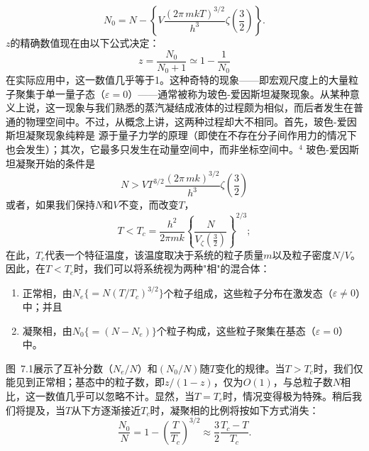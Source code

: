 \begin{equation}\tag{7.1.22}\label{eq:7.1.22}
N _ { 0 } = N - \left\{ V \frac { ( 2 \pi \, m k T ) ^{3 / 2} } { h ^{3} } \zeta \left( \frac { 3 } { 2 } \right) \right\} .
\end{equation}
\(z\)的精确数值现在由以下公式决定：
\begin{equation}\tag{7.1.23}\label{eq:7.1.23}
z = \frac { N _ { 0 } } { N _ { 0 } + 1 } \simeq 1 - \frac { 1 } { N _ { 0 } }
\end{equation}
在实际应用中，这一数值几乎等于1。这种奇特的现象——即宏观尺度上的大量粒子聚集于单一量子态（\(\varepsilon=0\)）——通常被称为玻色-爱因斯坦凝聚现象。从某种意义上说，这一现象与我们熟悉的蒸汽凝结成液体的过程颇为相似，而后者发生在普通的物理空间中。不过，从概念上讲，这两种过程却大不相同。首先，玻色-爱因斯坦凝聚现象纯粹是
源于量子力学的原理（即使在不存在分子间作用力的情况下也会发生）；其次，它最多只发生在动量空间中，而非坐标空间中。\(^{4}\)
玻色-爱因斯坦凝聚开始的条件是
\begin{equation}\tag{7.1.24}\label{eq:7.1.24}
N > V T ^{3 / 2} \frac { ( 2 \pi \, m k ) ^{3 / 2} } { h ^{3} } \zeta \left( \frac { 3 } { 2 } \right)
\end{equation}
或者，如果我们保持\(N\)和\(V\)不变，而改变\(T\)，
\begin{equation}\tag{7.1.25}\label{eq:7.1.25}
T < T _ { c } = \frac { h ^{2} } { 2 \pi m k } \left\{ \frac { N } { V _ { \zeta } \left( \frac { 3 } { 2 } \right) } \right\} ^{2 / 3} ;
\end{equation}
在此，\(T_{c}\)代表一个特征温度，该温度取决于系统的粒子质量\(m\)以及粒子密度\(N/V\)。因此，在\(T < T_{c}\)时，我们可以将系统视为两种"相"的混合体：
\begin{enumerate}
\def\labelenumi{(\roman{enumi})}
\item
  正常相，由\(N_{e} \{= N(T/T_{c})^{3/2}\}\)个粒子组成，这些粒子分布在激发态（\(\varepsilon \neq 0\)）中；并且
\item
  凝聚相，由\(N_{0} \{=(N-N_{e})\}\)个粒子构成，这些粒子聚集在基态（\(\varepsilon = 0\)）中。
\end{enumerate}
图~7.1展示了互补分数（\(N_{e}/N\)）和\((N_{0}/N)\)随\(T\)变化的规律。当\(T > T_{c}\)时，我们仅能见到正常相；基态中的粒子数，即\(z/(1-z)\)，仅为\(O(1)\)，与总粒子数\(N\)相比，这一数值几乎可以忽略不计。显然，当\(T = T_{c}\)时，情况变得极为特殊。稍后我们将提及，当\(T\)从下方逐渐接近\(T_{c}\)时，凝聚相的比例将按如下方式消失：
\begin{equation}\tag{7.1.26}\label{eq:7.1.26}
\frac { N _ { 0 } } { N } = 1 - \left( \frac { T } { T _ { c } } \right) ^{3 / 2} \approx \frac { 3 } { 2 } \frac { T _ { c } - T } { T _ { c } } .
\end{equation}
